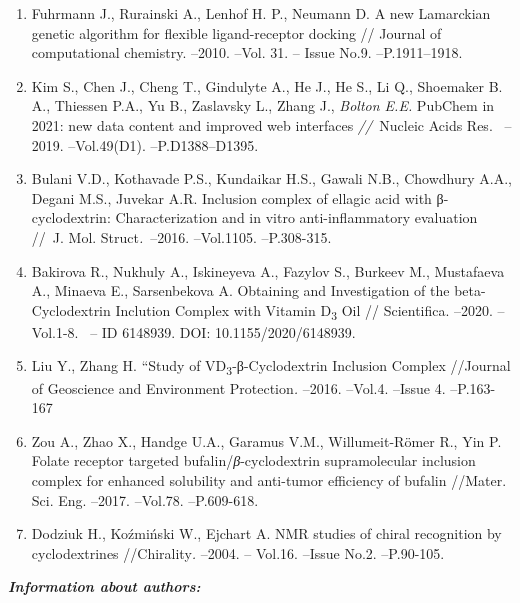 \begin{enumerate}
\item
Fuhrmann J., Rurainski A., Lenhof H. P., Neumann D. A new Lamarckian
genetic algorithm for flexible ligand-receptor docking // Journal of
computational chemistry. --2010. --Vol. 31. -- Issue No.9.
--P.1911--1918.

\item
Kim S., Chen J., Cheng T., Gindulyte A., He J., He S., Li Q.,
Shoemaker B. A., Thiessen P.A., Yu B., Zaslavsky L., Zhang J.,
\emph{Bolton E.E.} PubChem in 2021: new data content and improved web
interfaces \emph{//~}Nucleic Acids Res.~ --2019. --Vol.49(D1).
--P.D1388--D1395.

\item
Bulani V.D., Kothavade P.S., Kundaikar H.S., Gawali N.B., Chowdhury
A.A., Degani M.S., Juvekar A.R. Inclusion complex of ellagic acid with
β-cyclodextrin: Characterization and in vitro anti-inflammatory
evaluation //~J. Mol. Struct\emph{.}~--2016. --Vol.1105. --P.308-315.

\item
Bakirova R., Nukhuly A., Iskineyeva A., Fazylov S., Burkeev M.,
Mustafaeva A., Minaeva E., Sarsenbekova A. Obtaining and Investigation
of the beta-Cyclodextrin Inclution Complex with Vitamin
D\textsubscript{3} Oil // Scientifica. --2020. --Vol.1-8. ~-- ID
6148939. DOI: 10.1155/2020/6148939.

\item
Liu Y., Zhang H. ``Study of VD\textsubscript{3}-β-Cyclodextrin
Inclusion Complex //Journal of Geoscience and Environment
Protection\emph{.} --2016. --Vol.4. --Issue 4. --P.163-167

\item
Zou A., Zhao X., Handge U.A., Garamus V.M., Willumeit-Römer R., Yin
P. Folate receptor targeted bufalin/\emph{β}-cyclodextrin supramolecular
inclusion complex for enhanced solubility and anti-tumor efficiency of
bufalin //Mater. Sci. Eng. --2017. --Vol.78. --P.609-618.

\item
Dodziuk H., Koźmiński W., Ejchart A. NMR studies of chiral
recognition by cyclodextrines //Chirality\emph{.} --2004. -- Vol.16.
--Issue No.2. --P.90-105.
\end{enumerate}

\emph{{\bfseries Information about authors:}}

